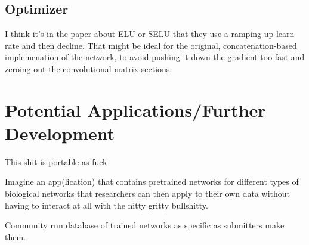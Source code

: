 \subsection{Optimizer}
I think it's in the paper about ELU or SELU that they use a ramping up learn 
rate and then decline. That might be ideal for the original, concatenation-based 
implemenation of the network, to avoid pushing it down the gradient too fast and 
zeroing out the convolutional matrix sections.

\section{Potential Applications/Further Development}

This shit is portable as fuck

Imagine an app(lication) that contains pretrained networks for different types 
of biological networks that researchers can then apply to their own data without 
having to interact at all with the nitty gritty bullshitty.

Community run database of trained networks as specific as submitters make them.
